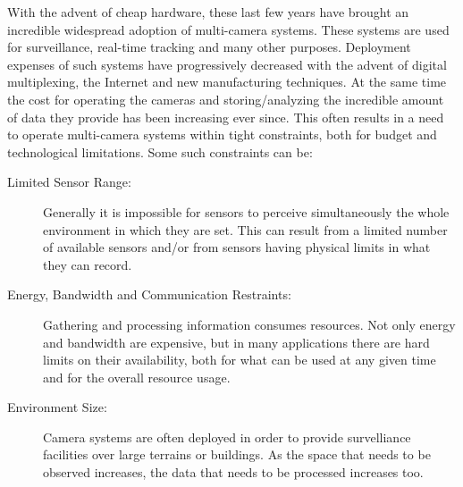 
With the advent of cheap hardware, these last few years have brought an incredible widespread
adoption of multi-camera systems. These systems are used for surveillance, real-time tracking and
many other purposes. Deployment expenses of such systems have progressively decreased with the
advent of digital multiplexing, the Internet and new manufacturing techniques. At the same time the
cost for operating the cameras and storing/analyzing the incredible amount of data they provide has
been increasing ever since. This often results in a need to operate multi-camera systems within
tight constraints, both for budget and technological limitations. Some such constraints can be:


\begin{description}
\item[Limited Sensor Range:] Generally it is impossible for sensors to perceive simultaneously the
    whole environment in which they are set. This can result from a limited number of available sensors
    and/or from sensors having physical limits in what they can record.

%

\item[Energy, Bandwidth and Communication Restraints:] Gathering and processing information consumes
    resources. Not only energy and bandwidth are expensive, but in many applications there are hard
    limits on their availability, both for what can be used at any given time and for the overall
    resource usage.
\item[Environment Size:] Camera systems are often deployed in order to provide survelliance
    facilities over large terrains or buildings. As the space that needs to be observed increases, the
    data that needs to be processed increases too.
\end{description}

